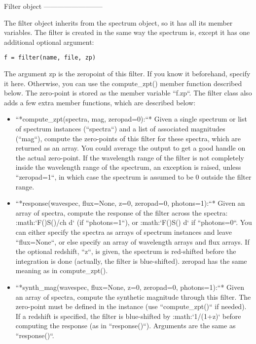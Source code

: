 Filter object
--------------------------

The filter object inherits from the spectrum object, so it has all
its member variables. The filter is created in the same way the spectrum
is, except it has one additional optional argument:

\begin{verbatim}
f = filter(name, file, zp)
\end{verbatim}


The argument zp is the zeropoint of this filter. If you know it beforehand,
specify it here. Otherwise, you can use the compute_zpt() member
function described below. The zero-point is stored as the member variable
``f.zp``. The filter class also adds a few extra member functions,
which are described below:
\begin{itemize}
\item ``*compute_zpt(spectra, mag, zeropad=0):``* Given a single
spectrum or list of spectrum instances (``spectra``) and a list
of associated magnitudes (``mag``), compute the zero-points of
this filter for these spectra, which are returned as an array. You
could average the output to get a good handle on the actual zero-point.
If the wavelength range of the filter is not completely inside the
wavelength range of the spectrum, an exception is raised, unless ``zeropad=1``,
in which case the spectrum is assumed to be 0 outside the filter range.
\item ``*response(wavespec, flux=None, z=0, zeropad=0, photons=1):``*
Given an array of spectra, compute the response of the filter across
the spectra: :math:`\int F(\lambda)S(\lambda)\lambda/ch\: d\lambda` (if
``photons=1``), or :math:`\int F(\lambda)S(\lambda)\: d\lambda` if
``photons=0``. You can either specify the spectra as arrays of
spectrum instances and leave ``flux=None``, or else specify an
array of wavelength arrays and flux arrays. If the optional redshift,
``z``, is given, the spectrum is red-shifted before the integration
is done (actually, the filter is blue-shifted). zeropad has the same
meaning as in compute_zpt(). 
\item ``*synth_mag(wavespec, flux=None, z=0, zeropad=0, photons=1):``*
Given an array of spectra, compute the synthetic magnitude through
this filter. The zero-point must be defined in the instance (use ``compute_zpt()``
if needed). If a redshift is specified, the filter is blue-shifted
by :math:`1/(1+z)` before computing the response (as in ``response()``).
Arguments are the same as ``response()``.
\end{itemize}

